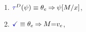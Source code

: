 \begin{definition}
\begin{enumerate}[topsep=0pt,label=(\textsc{w}\arabic*),ref=\textsc{w}\arabic*]
    
  \item \label{write-tau-ca}
    \begin{math}
      \aTr{\bEvs}{\bForm} \riff 
      \cForm_\aEv
      \limplies 
      \bForm[\aExp/\aLoc]
    \end{math},
  \item \label{write-term-ca}
    $\aTerm \riff \cForm_\aEv \limplies \aExp{=}\aVal_\aEv$,
  \end{enumerate}


\end{definition}
